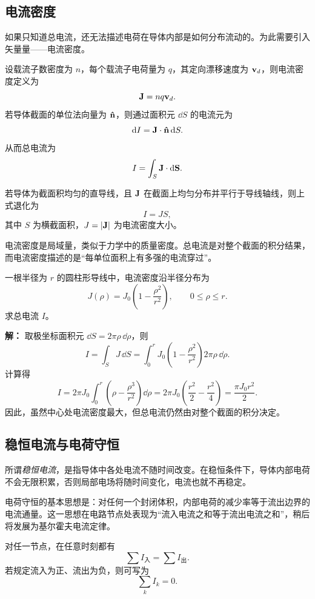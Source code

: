 \subsection{电流密度}

如果只知道总电流，还无法描述电荷在导体内部是如何分布流动的。为此需要引入矢量量——电流密度。

\begin{definition}
设载流子数密度为 $n$，每个载流子电荷量为 $q$，其定向漂移速度为 $\vb{v}_d$，则电流密度定义为
\[
\vb{J}=nq\vb{v}_d.
\]
若导体截面的单位法向量为 $\vu{n}$，则通过面积元 $\dd S$ 的电流元为
\[
\dd I=\vb{J}\cdot \vu{n}\,\dd S.
\]
从而总电流为
\[
I=\int_S \vb{J}\cdot \dd \vb{S}.
\]
\end{definition}

若导体为截面积均匀的直导线，且 $\vb{J}$ 在截面上均匀分布并平行于导线轴线，则上式退化为
\[
I=JS,
\]
其中 $S$ 为横截面积，$J=\left|\vb{J}\right|$ 为电流密度大小。

\begin{remark}
电流密度是局域量，类似于力学中的质量密度。总电流是对整个截面的积分结果，而电流密度描述的是“每单位面积上有多强的电流穿过”。
\end{remark}

\begin{example}
一根半径为 $r$ 的圆柱形导线中，电流密度沿半径分布为
\[
J(\rho)=J_0\left(1-\frac{\rho^2}{r^2}\right), \qquad 0\le \rho\le r.
\]
求总电流 $I$。

\textbf{解：}
取极坐标面积元 $\dd S=2\pi \rho\,\dd \rho$，则
\[
I=\int_S J\,\dd S
=\int_0^r J_0\left(1-\frac{\rho^2}{r^2}\right)2\pi\rho\,\dd \rho.
\]
计算得
\[
I=2\pi J_0\int_0^r \left(\rho-\frac{\rho^3}{r^2}\right)\dd \rho
=2\pi J_0\left(\frac{r^2}{2}-\frac{r^2}{4}\right)
=\frac{\pi J_0 r^2}{2}.
\]
因此，虽然中心处电流密度最大，但总电流仍然由对整个截面的积分决定。
\end{example}

\subsection{稳恒电流与电荷守恒}

所谓\emph{稳恒电流}，是指导体中各处电流不随时间改变。在稳恒条件下，导体内部电荷不会无限积累，否则局部电场将随时间变化，电流也就不再稳定。

电荷守恒的基本思想是：对任何一个封闭体积，内部电荷的减少率等于流出边界的电流通量。这一思想在电路节点处表现为“流入电流之和等于流出电流之和”，稍后将发展为基尔霍夫电流定律。

\begin{law}[电荷守恒的电路表述]
对任一节点，在任意时刻都有
\[
\sum I_{\text{入}}=\sum I_{\text{出}}.
\]
若规定流入为正、流出为负，则可写为
\[
\sum_k I_k=0.
\]
\end{law}

